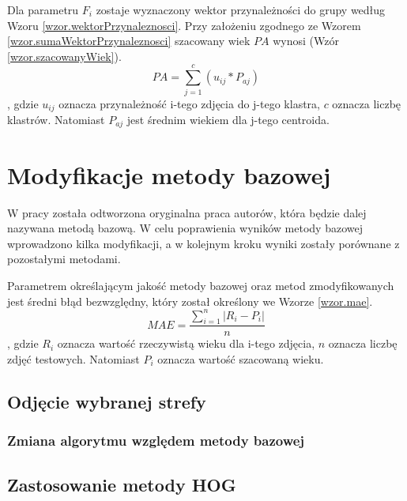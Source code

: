 \documentclass[a4paper,twoside,12pt]{book}
\begin{document}
    Dla parametru $F_{i}$ zostaje wyznaczony wektor przynależności do grupy
    według Wzoru \ref{wzor.wektorPrzynaleznosci}.
    Przy założeniu zgodnego ze Wzorem \ref{wzor.sumaWektorPrzynaleznosci} szacowany wiek $PA$ wynosi %
    (Wzór \ref{wzor.szacowanyWiek}).
    \large
    \begin{equation}
        PA=\sum_{j=1}^{c}(u_{ij}*P_{aj})
        \label{wzor.szacowanyWiek}
    \end{equation}
    \normalsize
    , gdzie $u_{ij}$ oznacza przynależność i-tego zdjęcia do j-tego klastra, $c$ oznacza liczbę klastrów.
    Natomiast $P_{aj}$ jest średnim wiekiem dla j-tego centroida.

    \chapter{Modyfikacje metody bazowej}\label{ch:modyfikacje-metody-bazowej}
    W pracy została odtworzona oryginalna praca autorów, która
    będzie dalej nazywana metodą bazową.
    W celu poprawienia wyników metody bazowej wprowadzono kilka modyfikacji, a
    w kolejnym kroku wyniki zostały porównane z pozostałymi metodami.

    Parametrem określającym jakość metody bazowej oraz metod zmodyfikowanych jest średni błąd bezwzględny,
    który został określony we Wzorze \ref{wzor.mae}.
    \large
    \begin{equation}
        MAE = \frac{\sum_{i=1}^{n}\left | R_{i}-P_{i} \right |}{n}
        \label{wzor.mae}
    \end{equation}
    \normalsize
    , gdzie $R_{i}$ oznacza wartość rzeczywistą wieku dla i-tego zdjęcia, $n$ oznacza liczbę zdjęć testowych.
    Natomiast $P_{i}$ oznacza wartość szacowaną wieku.

    \section{Odjęcie wybranej strefy}\label{sec:odjęcie-wybranej-strefy}


    \subsection{Zmiana algorytmu względem metody bazowej}\label{subsec:zmiana-algorytmu-względem-metody-bazowej}

    \section{Zastosowanie metody HOG}\label{sec:zastosowanie-metody-hog}
\end{document}
